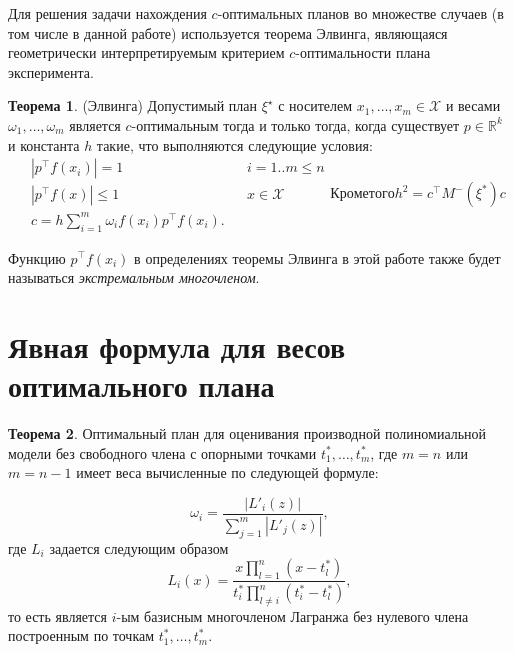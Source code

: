 \documentclass[specialist,
               substylefile = spbu.rtx,
               subf,href,colorlinks=true, 12pt]{disser}
\theoremstyle{definition}
\newtheorem{theorem}{Теорема}
\newcommand\abs[1]{\left\lvert#1\right\rvert}
\begin{document}
  Для решения задачи нахождения $c$-оптимальных планов во множестве случаев (в том числе в данной работе) используется теорема Элвинга, являющаяся геометрически интерпретируемым критерием $c$-оптимальности плана эксперимента.
  \begin{theorem}
  \label{th:elfving}
  (Элвинга) \cite{melas2010}
  Допустимый план $\xi^\star$ с носителем $x_1, \ldots, x_m \in \mathcal{X}$ и весами $\omega_1, \ldots, \omega_m$ является $c$-оптимальным тогда и только тогда, когда существует $p \in \mathbb{R}^k$ и константа $h$ такие, что выполняются следующие условия:
  \begin{subequations}
  \label{eq:elfving}
  \begin{align}
	&\abs{p^\top f(x_i)} = 1 &&i=1..m \leqslant n \label{eq:elfving:eq1} \\
	&\abs{p^\top f(x)} \leqslant 1  &&x \in \mathcal{X} \label{eq:elfving:eq2} \\
	&c = h \sum_{i=1}^m \omega_i f(x_i) p^\top f(x_i) \label{eq:elfving:eq3}.
  \end{align}
  Кроме того
  \begin{equation*}
  	h^2 = c^\top M^{-}(\xi^{*})c
  \end{equation*}
  \end{subequations}
  \end{theorem}
	Функцию $p^\top f(x_i)$ в определениях теоремы Элвинга в этой работе также будет называться \textit{экстремальным многочленом}.
	
	\section{Явная формула для весов оптимального плана}
	
	\begin{theorem}
	\label{th:weights}
	Оптимальный план для оценивания производной полиномиальной модели без свободного члена с опорными точками $t_1^*, \ldots, t_m^*$, где $m=n$ или $m=n-1$ имеет веса вычисленные по следующей формуле:	
	
	\begin{equation}
	\label{eq:weights}
		\omega_i = \frac{\abs{L'_i(z)}}{\sum_{j=1}^m \abs{L'_j(z)}},
	\end{equation}
	где $L_i$ задается следующим образом
	\begin{equation}
		\label{eq:lagr}
		L_{i}(x) = \frac{x \prod_{l=1}^n (x - t_l^*)}{t_i^* \prod_{l \neq i}^n (t_i^* - t_l^*)},
	\end{equation}	
	то есть является $i$-ым базисным многочленом Лагранжа без нулевого члена построенным по точкам $t_1^*, \ldots, t_m^*$.
	\end{theorem}
	
\end{document}
